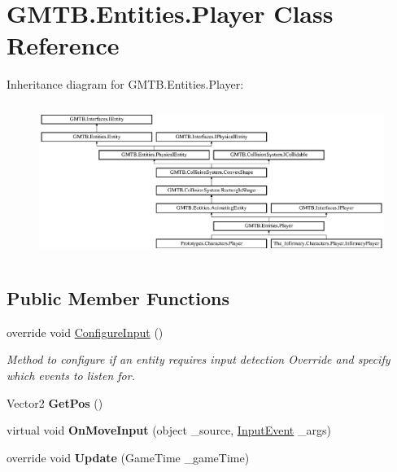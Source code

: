 \hypertarget{class_g_m_t_b_1_1_entities_1_1_player}{}\section{G\+M\+T\+B.\+Entities.\+Player Class Reference}
\label{class_g_m_t_b_1_1_entities_1_1_player}
Inheritance diagram for G\+M\+T\+B.\+Entities.\+Player\+:\begin{figure}[H]
\begin{center}
\leavevmode
\includegraphics[height=5.028059cm]{class_g_m_t_b_1_1_entities_1_1_player}
\end{center}
\end{figure}
\subsection*{Public Member Functions}
\begin{DoxyCompactItemize}
\item 
override void \mbox{\hyperlink{class_g_m_t_b_1_1_entities_1_1_player_af7c91590f66efe071a0dec4853c30265}{Configure\+Input}} ()
\begin{DoxyCompactList}\small\item\em Method to configure if an entity requires input detection Override and specify which events to listen for. \end{DoxyCompactList}\item 
\mbox{\label{class_g_m_t_b_1_1_entities_1_1_player_a413126bb0b5fad7bc35c3c3b8340d2bb}} 
Vector2 {\bfseries Get\+Pos} ()
\item 
\mbox{\label{class_g_m_t_b_1_1_entities_1_1_player_ad7f4fc37fc9c0369aa9daa265ec82a3f}} 
virtual void {\bfseries On\+Move\+Input} (object \+\_\+source, \mbox{\hyperlink{class_g_m_t_b_1_1_input_system_1_1_input_event}{Input\+Event}} \+\_\+args)
\item 
\mbox{\label{class_g_m_t_b_1_1_entities_1_1_player_a32137870cf6017e80ba47fab7096f551}} 
override void {\bfseries Update} (Game\+Time \+\_\+game\+Time)
\end{DoxyCompactItemize}
